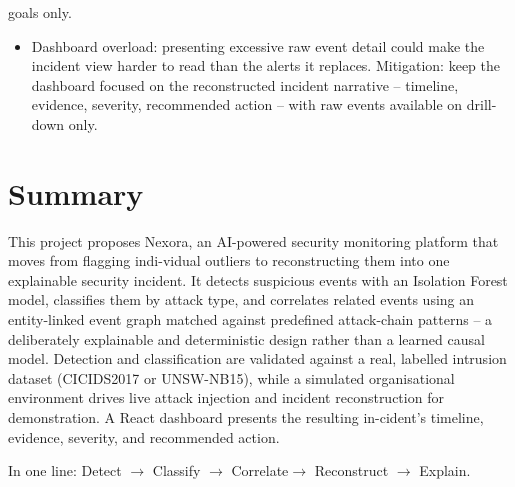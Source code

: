 \documentclass[12pt]{article}
\begin{document}
goals only.

\begin{itemize}
  \item Dashboard overload: presenting excessive raw event detail could make the incident view harder to read than the alerts it replaces. Mitigation: keep the dashboard focused on the reconstructed incident narrative -- timeline, evidence, severity, recommended action -- with raw events available on drill-down only.
\end{itemize}

\section{Summary}

This project proposes Nexora, an AI-powered security monitoring platform that moves from flagging indi-vidual outliers to reconstructing them into one explainable security incident. It detects suspicious events with an Isolation Forest model, classifies them by attack type, and correlates related events using an entity-linked event graph matched against predefined attack-chain patterns -- a deliberately explainable and deterministic design rather than a learned causal model. Detection and classification are validated against a real, labelled intrusion dataset (CICIDS2017 or UNSW-NB15), while a simulated organisational environment drives live attack injection and incident reconstruction for demonstration. A React dashboard presents the resulting in-cident's timeline, evidence, severity, and recommended action.

In one line: Detect $\rightarrow$ Classify $\rightarrow$ Correlate$\rightarrow$ Reconstruct $\rightarrow$ Explain.
\end{document}
